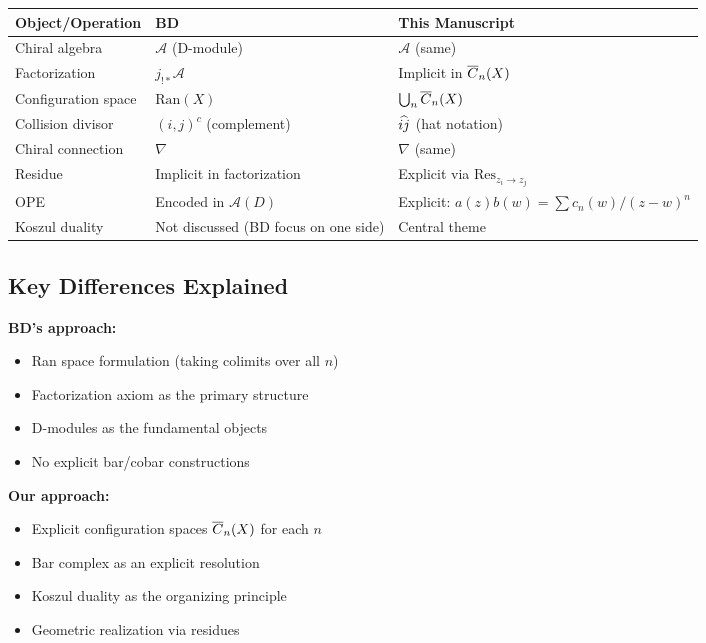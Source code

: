 \begin{center}
\begin{tabular}{|p{6cm}|p{4cm}|p{4cm}|}
\hline
\textbf{Object/Operation} & \textbf{BD \cite{BD04}} & \textbf{This Manuscript} \\
\hline
Chiral algebra & $\mathcal{A}$ (D-module) & $\mathcal{A}$ (same) \\
Factorization & $j_{!*}\mathcal{A}$ & Implicit in $\overline{C}_{n}(X)$ \\
Configuration space & $\text{Ran}(X)$ & $\bigcup_n \overline{C}_{n}(X)$ \\
Collision divisor & $(i,j)^c$ (complement) & $\widehat{ij}$ (hat notation) \\
Chiral connection & $\nabla$ & $\nabla$ (same) \\
Residue & Implicit in factorization & Explicit via $\text{Res}_{z_i \to z_j}$ \\
OPE & Encoded in $\mathcal{A}(D)$ & Explicit: $a(z)b(w) = \sum c_n(w)/(z-w)^n$ \\
Koszul duality & Not discussed (BD focus on one side) & Central theme \\
\hline
\end{tabular}
\end{center}

\subsection{Key Differences Explained}

\textbf{BD's approach:}
\begin{itemize}
\item Ran space formulation (taking colimits over all $n$)
\item Factorization axiom as the primary structure
\item D-modules as the fundamental objects
\item No explicit bar/cobar constructions
\end{itemize}

\textbf{Our approach:}
\begin{itemize}
\item Explicit configuration spaces $\overline{C}_{n}(X)$ for each $n$
\item Bar complex as an explicit resolution
\item Koszul duality as the organizing principle
\item Geometric realization via residues
\end{itemize}

